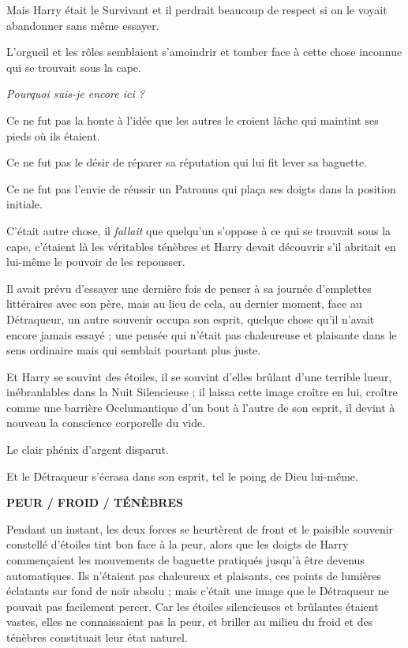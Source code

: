 Mais Harry était le Survivant et il perdrait beaucoup de respect si on le voyait abandonner sans même essayer.

L'orgueil et les rôles semblaient s'amoindrir et tomber face à cette chose inconnue qui se trouvait sous la cape.

\emph{Pourquoi suis-je encore ici ?} 

Ce ne fut pas la honte à l'idée que les autres le croient lâche qui maintint ses pieds où ils étaient.

Ce ne fut pas le désir de réparer sa réputation qui lui fit lever sa baguette.

Ce ne fut pas l'envie de réussir un Patronus qui plaça ses doigts dans la position initiale.

C'était autre chose, il \emph{fallait}  que quelqu'un s'oppose à ce qui se trouvait sous la cape, c'étaient là les véritables ténèbres et Harry devait découvrir s'il abritait en lui-même le pouvoir de les repousser.

Il avait prévu d'essayer une dernière fois de penser à sa journée d'emplettes littéraires avec son père, mais au lieu de cela, au dernier moment, face au Détraqueur, un autre souvenir occupa son esprit, quelque chose qu'il n'avait encore jamais essayé ; une pensée qui n'était pas chaleureuse et plaisante dans le sens ordinaire mais qui semblait pourtant plus juste.

Et Harry se souvint des étoiles, il se souvint d'elles brûlant d'une terrible lueur, inébranlables dans la Nuit Silencieuse ; il laissa cette image croître en lui, croître comme une barrière Occlumantique d'un bout à l'autre de son esprit, il devint à nouveau la conscience corporelle du vide.

Le clair phénix d'argent disparut.

Et le Détraqueur s'écrasa dans son esprit, tel le poing de Dieu lui-même.

\textbf{PEUR / FROID / TÉNÈBRES} 

Pendant un instant, les deux forces se heurtèrent de front et le paisible souvenir constellé d'étoiles tint bon face à la peur, alors que les doigts de Harry commençaient les mouvements de baguette pratiqués jusqu'à être devenus automatiques. Ils n'étaient pas chaleureux et plaisants, ces points de lumières éclatants sur fond de noir absolu ; mais c'était une image que le Détraqueur ne pouvait pas facilement percer. Car les étoiles silencieuses et brûlantes étaient vastes, elles ne connaissaient pas la peur, et briller au milieu du froid et des ténèbres constituait leur état naturel.

